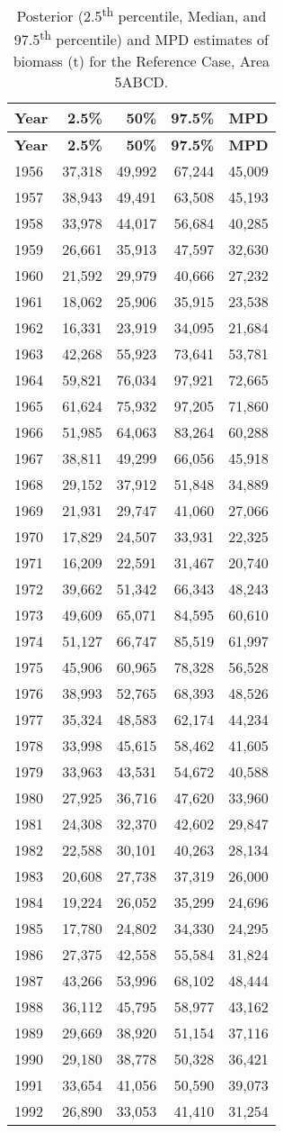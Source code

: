 \documentclass[11pt]{book}
\begin{document}
\begin{longtable}[]{@{}lrrrr@{}}
\caption{\label{tab:tab-post-biomass-5abcd}Posterior (2.5\textsuperscript{th} percentile, Median, and 97.5\textsuperscript{th} percentile) and MPD estimates of biomass (t) for the Reference Case, Area 5ABCD.}\tabularnewline
\toprule
\textbf{Year} & \textbf{2.5\%} & \textbf{50\%} & \textbf{97.5\%} & \textbf{MPD}\tabularnewline
\midrule
\endfirsthead
\toprule
\textbf{Year} & \textbf{2.5\%} & \textbf{50\%} & \textbf{97.5\%} & \textbf{MPD}\tabularnewline
\midrule
\endhead
1956 & 37,318 & 49,992 & 67,244 & 45,009\tabularnewline
1957 & 38,943 & 49,491 & 63,508 & 45,193\tabularnewline
1958 & 33,978 & 44,017 & 56,684 & 40,285\tabularnewline
1959 & 26,661 & 35,913 & 47,597 & 32,630\tabularnewline
1960 & 21,592 & 29,979 & 40,666 & 27,232\tabularnewline
1961 & 18,062 & 25,906 & 35,915 & 23,538\tabularnewline
1962 & 16,331 & 23,919 & 34,095 & 21,684\tabularnewline
1963 & 42,268 & 55,923 & 73,641 & 53,781\tabularnewline
1964 & 59,821 & 76,034 & 97,921 & 72,665\tabularnewline
1965 & 61,624 & 75,932 & 97,205 & 71,860\tabularnewline
1966 & 51,985 & 64,063 & 83,264 & 60,288\tabularnewline
1967 & 38,811 & 49,299 & 66,056 & 45,918\tabularnewline
1968 & 29,152 & 37,912 & 51,848 & 34,889\tabularnewline
1969 & 21,931 & 29,747 & 41,060 & 27,066\tabularnewline
1970 & 17,829 & 24,507 & 33,931 & 22,325\tabularnewline
1971 & 16,209 & 22,591 & 31,467 & 20,740\tabularnewline
1972 & 39,662 & 51,342 & 66,343 & 48,243\tabularnewline
1973 & 49,609 & 65,071 & 84,595 & 60,610\tabularnewline
1974 & 51,127 & 66,747 & 85,519 & 61,997\tabularnewline
1975 & 45,906 & 60,965 & 78,328 & 56,528\tabularnewline
1976 & 38,993 & 52,765 & 68,393 & 48,526\tabularnewline
1977 & 35,324 & 48,583 & 62,174 & 44,234\tabularnewline
1978 & 33,998 & 45,615 & 58,462 & 41,605\tabularnewline
1979 & 33,963 & 43,531 & 54,672 & 40,588\tabularnewline
1980 & 27,925 & 36,716 & 47,620 & 33,960\tabularnewline
1981 & 24,308 & 32,370 & 42,602 & 29,847\tabularnewline
1982 & 22,588 & 30,101 & 40,263 & 28,134\tabularnewline
1983 & 20,608 & 27,738 & 37,319 & 26,000\tabularnewline
1984 & 19,224 & 26,052 & 35,299 & 24,696\tabularnewline
1985 & 17,780 & 24,802 & 34,330 & 24,295\tabularnewline
1986 & 27,375 & 42,558 & 55,584 & 31,824\tabularnewline
1987 & 43,266 & 53,996 & 68,102 & 48,444\tabularnewline
1988 & 36,112 & 45,795 & 58,977 & 43,162\tabularnewline
1989 & 29,669 & 38,920 & 51,154 & 37,116\tabularnewline
1990 & 29,180 & 38,778 & 50,328 & 36,421\tabularnewline
1991 & 33,654 & 41,056 & 50,590 & 39,073\tabularnewline
1992 & 26,890 & 33,053 & 41,410 & 31,254\tabularnewline

\end{longtable}
\end{document}
